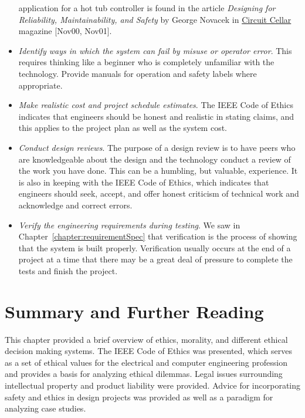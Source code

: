 \begin{itemize}
  application for a hot tub controller is found in the article
  \emph{Designing for Reliability, Maintainability, and Safety} by
  George Novacek in \ul{Circuit Cellar} magazine {[}Nov00, Nov01{]}.
\item
  \emph{Identify ways in which the system can fail by misuse or operator
  error}. This requires thinking like a beginner who is completely
  unfamiliar with the technology. Provide manuals for operation and
  safety labels where appropriate.
\item
  \emph{Make realistic cost and project schedule estimates}. The IEEE
  Code of Ethics indicates that engineers should be honest and realistic
  in stating claims, and this applies to the project plan as well as the
  system cost.
\item
  \emph{Conduct design reviews}. The purpose of a design review is to
  have peers who are knowledgeable about the design and the technology
  conduct a review of the work you have done. This can be a humbling,
  but valuable, experience. It is also in keeping with the IEEE Code of
  Ethics, which indicates that engineers should seek, accept, and offer
  honest criticism of technical work and acknowledge and correct errors.
\item
  \emph{Verify the engineering requirements during testing}. We saw in
  Chapter~\ref{chapter:requirementSpec} that verification is the 
process of showing that the system
  is built properly. Verification usually occurs at the end of a project
  at a time that there may be a great deal of pressure to complete the
  tests and finish the project.
\end{itemize}

\section{Summary and Further Reading}
\label{section:ethicsSummary-and-further-reading}

This chapter provided a brief overview of ethics, morality, and
different ethical decision making systems. The IEEE Code of Ethics was
presented, which serves as a set of ethical values for the electrical
and computer engineering profession and provides a basis for analyzing
ethical dilemmas. Legal issues surrounding intellectual property and
product liability were provided. Advice for incorporating safety and
ethics in design projects was provided as well as a paradigm for
analyzing case studies.

